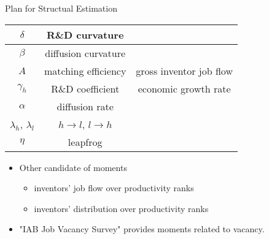 \documentclass{beamer}
\begin{document}
\begin{frame}{Plan for Structual Estimation \hypertarget{5}{}}
  \setlength\itemsep{3mm}
  \begin{center}
    \begin{tabular}{c c c}
      \hline
      $\delta$                 & R\&D curvature                       &                         \\
      \hline
      $\beta$                  & diffusion curvature                  &                         \\
      \hline
      $A$                      & matching efficiency                  & gross inventor job flow \\
      \hline
      $\gamma_h$               & R\&D coefficient                     & economic growth rate    \\
      \hline
      $\alpha$                 & diffusion rate                       &                         \\
      \hline
      $\lambda_h$, $\lambda_l$ & $h \rightarrow l$, $l \rightarrow h$ &                         \\
      \hline
      $\eta$                   & leapfrog                             &                         \\
      \hline
    \end{tabular}
  \end{center}
  \begin{itemize}
    \item Other candidate of moments
          \begin{itemize}
            \item inventors' job flow over productivity ranks \hyperlink{8}{}
            \item inventors' distribution over productivity ranks \hyperlink{6}{}
          \end{itemize}
    \item "IAB Job Vacancy Survey" provides moments related to vacancy.
  \end{itemize}
\end{frame}


\end{document}
